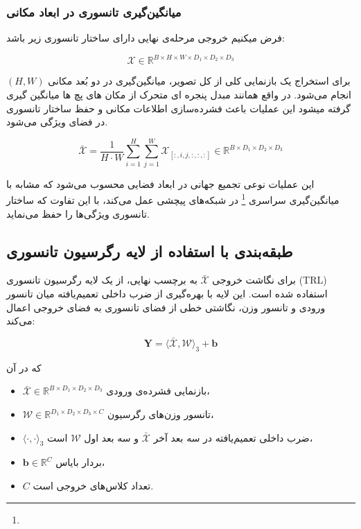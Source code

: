 \subsubsection*{میانگین‌گیری تانسوری در ابعاد مکانی}

فرض میکنیم خروجی مرحله‌ی نهایی دارای ساختار تانسوری زیر باشد:

\[
\mathcal{X} \in \mathbb{R}^{B \times H \times W \times D_1 \times D_2 \times D_3}
\]


برای استخراج یک بازنمایی کلی از کل تصویر، میانگین‌گیری در دو بُعد مکانی $(H, W)$ انجام می‌شود. 
در واقع همانند مبدل پنجره ای متحرک از مکان های پچ ها میانگین گیری گرفته میشود 
این عملیات باعث فشرده‌سازی اطلاعات مکانی و حفظ ساختار تانسوری در فضای ویژگی می‌شود.

\begin{equation}
	\bar{\mathcal{X}} = \frac{1}{H \cdot W} \sum_{i=1}^{H} \sum_{j=1}^{W} \mathcal{X}_{[:, i, j, :, :, :]} 
	\in \mathbb{R}^{B \times D_1 \times D_2 \times D_3}
\end{equation}


این عملیات نوعی تجمیع جهانی در ابعاد فضایی محسوب می‌شود که مشابه با میانگین‌گیری سراسری \footnote{}  در شبکه‌های پیچشی عمل می‌کند، با این تفاوت که ساختار تانسوری ویژگی‌ها را حفظ می‌نماید.

\subsection{طبقه‌بندی با استفاده از لایه رگرسیون تانسوری}

برای نگاشت خروجی $\bar{\mathcal{X}}$ به برچسب نهایی، از یک لایه رگرسیون تانسوری (TRL) استفاده شده است. این لایه با بهره‌گیری از ضرب داخلی تعمیم‌یافته میان تانسور ورودی و تانسور وزن، نگاشتی خطی از فضای تانسوری به فضای خروجی اعمال می‌کند:

\begin{equation}
	\mathbf{Y} = \langle \bar{\mathcal{X}}, \mathcal{W} \rangle_3 + \mathbf{b}
\end{equation}

که در آن
\begin{itemize}
	\item $\bar{\mathcal{X}} \in \mathbb{R}^{B \times D_1 \times D_2 \times D_3}$ بازنمایی فشرده‌ی ورودی،
	\item $\mathcal{W} \in \mathbb{R}^{D_1 \times D_2 \times D_3 \times C}$ تانسور وزن‌های رگرسیون،
	\item $\langle \cdot, \cdot \rangle_3$ ضرب داخلی تعمیم‌یافته در سه بعد آخر $\bar{\mathcal{X}}$ و سه بعد اول $\mathcal{W}$ است،
	\item $\mathbf{b} \in \mathbb{R}^{C}$ بردار بایاس،
	\item $C$ تعداد کلاس‌های خروجی است.
\end{itemize}









